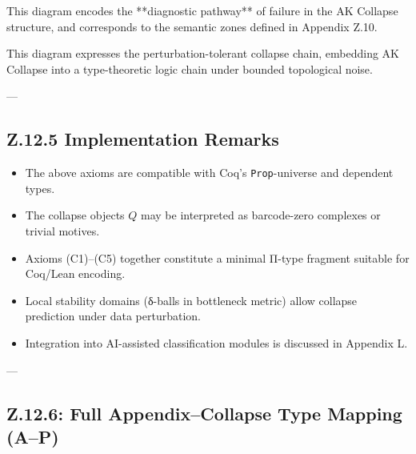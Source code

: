 \documentclass[11pt]{article}
\begin{document}
\begin{axiom}
\begin{axiom}
{{This diagram encodes the **diagnostic pathway** of failure in the AK Collapse structure,  
and corresponds to the semantic zones defined in Appendix Z.10.

This diagram expresses the perturbation-tolerant collapse chain, embedding AK Collapse into a type-theoretic logic chain under bounded topological noise.

---

\subsection*{Z.12.5 Implementation Remarks}

\begin{itemize}
  \item The above axioms are compatible with Coq’s \texttt{Prop}-universe and dependent types.
  \item The collapse objects \( Q \) may be interpreted as barcode-zero complexes or trivial motives.
  \item Axioms (C1)–(C5) together constitute a minimal Π-type fragment suitable for Coq/Lean encoding.
  \item Local stability domains (δ-balls in bottleneck metric) allow collapse prediction under data perturbation.
  \item Integration into AI-assisted classification modules is discussed in Appendix L.
\end{itemize}

---

\subsection*{Z.12.6: Full Appendix–Collapse Type Mapping (A–P)}

}}
\end{axiom}
\end{axiom}
\end{document}
